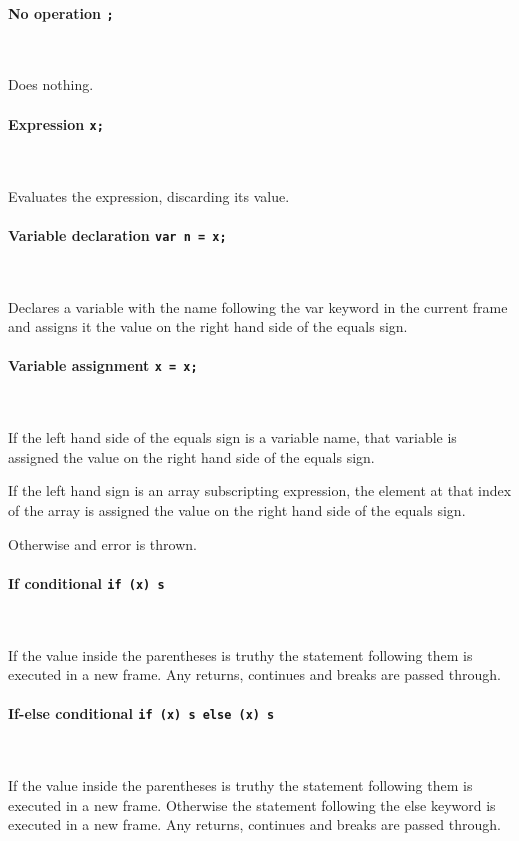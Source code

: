 \documentclass[12pt, a4paper]{article}
\begin{document}
\paragraph{No operation \quad \texttt{;}} \

Does nothing.

\paragraph{Expression \quad \texttt{x;}} \

Evaluates the expression, discarding its value.

\paragraph{Variable declaration \quad \texttt{var n = x;} } \

Declares a variable with the name following the var keyword in the current frame and assigns it the value on the right hand side of the equals sign.

\paragraph{Variable assignment \quad \texttt{x = x;} } \

If the left hand side of the equals sign is a variable name, that variable is assigned the value on the right hand side of the equals sign.

If the left hand sign is an array subscripting expression, the element at that index of the array is assigned the value on the right hand side of the equals sign.

Otherwise and error is thrown.

\paragraph{If conditional \quad \texttt{if (x) s} } \

If the value inside the parentheses is truthy the statement following them is executed in a new frame. Any returns, continues and breaks are passed through.

\paragraph{If-else conditional \quad \texttt{if (x) s else (x) s} } \

If the value inside the parentheses is truthy the statement following them is executed in a new frame. Otherwise the statement following the else keyword is executed in a new frame. Any returns, continues and breaks are passed through.
\end{document}
